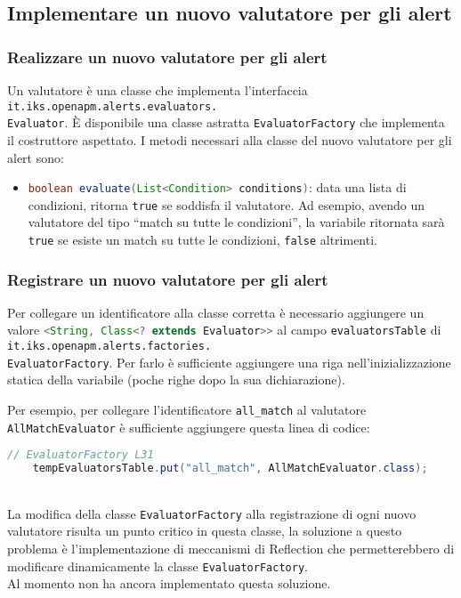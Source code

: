 \subsection{Implementare un nuovo valutatore per gli alert}
\label{newvalutatore}
	\subsubsection{Realizzare un nuovo valutatore per gli alert}
	
		Un valutatore è una classe che implementa l'interfaccia \lstinline{it.iks.openapm.alerts.evaluators.}\\
		\lstinline{Evaluator}.
		È disponibile una classe astratta \lstinline{EvaluatorFactory} che implementa il costruttore aspettato.
		I metodi necessari alla classe del nuovo valutatore per gli alert sono:
			
		\begin{itemize}
		
			\item \lstinline[language=Java]{boolean evaluate(List<Condition> conditions)}:
				data una lista di condizioni, ritorna \lstinline{true} se soddisfa il valutatore.
				Ad esempio, avendo un valutatore del tipo ``match su tutte le condizioni'',
				la variabile ritornata sarà \lstinline{true} se esiste un match su tutte le condizioni,
				\lstinline{false} altrimenti. 
		\end{itemize}
	
	\subsubsection{Registrare un nuovo valutatore per gli alert}
	
		Per collegare un identificatore alla classe corretta è necessario aggiungere un valore 
		\lstinline[language=Java]{<String, Class<? extends Evaluator>>} al campo \lstinline{evaluatorsTable} 
		di \lstinline{it.iks.openapm.alerts.factories.}\\ \lstinline{EvaluatorFactory}. 
		Per farlo è sufficiente aggiungere una riga nell'inizializzazione statica della variabile 
		(poche righe dopo la sua dichiarazione).

		Per esempio, per collegare l'identificatore \lstinline{all_match} al valutatore \lstinline{AllMatchEvaluator} è
		sufficiente aggiungere questa linea di codice:
		\begin{lstlisting}[language=Java]
	// EvaluatorFactory L31
	tempEvaluatorsTable.put("all_match", AllMatchEvaluator.class);
		\end{lstlisting}\\
		
		La modifica della classe \verb=EvaluatorFactory= alla registrazione di ogni nuovo valutatore risulta un punto critico in 
		questa classe, la soluzione a questo problema è l'implementazione di meccanismi di Reflection che permetterebbero
		di modificare dinamicamente la classe \verb=EvaluatorFactory=.\\
		Al momento \GroupName{} non ha ancora implementato questa soluzione.